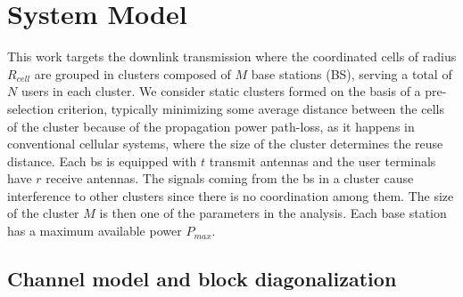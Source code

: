 
\section{System Model}\label{sec:system_model}

This work targets the downlink transmission where the coordinated cells of radius $R_{cell}$ are grouped in clusters composed of $M$ base stations (BS), serving a total of $N$ users in each cluster.
We consider static clusters formed on the basis of a pre-selection criterion, typically minimizing some average distance between the cells of the cluster because of the propagation power path-loss, as it happens in conventional cellular systems, where the size of the cluster determines the reuse distance.
Each \gls{bs} is equipped with $t$ transmit antennas and the user terminals have $r$ receive antennas. The signals coming from the \gls{bs} in a cluster cause interference to other clusters since there is no coordination among them. The size of the cluster $M$ is then one of the parameters in the analysis. Each base station has a maximum available power $P_{max}$.


\subsection{Channel model and block diagonalization}\label{ChannelModel}

